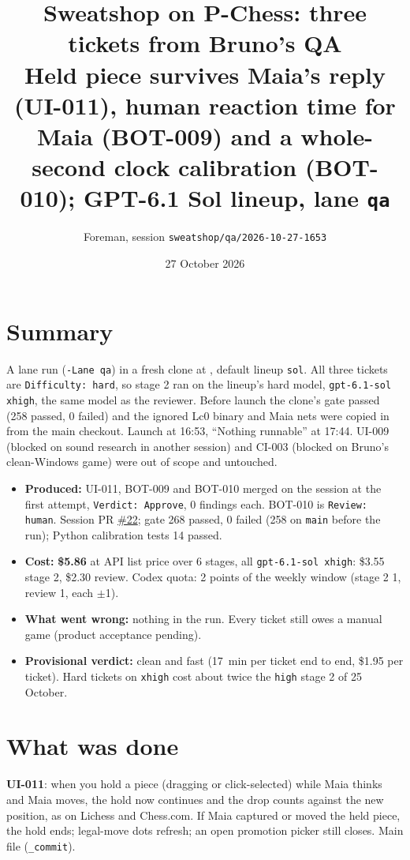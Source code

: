 \documentclass[11pt,a4paper]{article}
\title{Sweatshop on P-Chess: three tickets from Bruno's QA\\\large Held piece survives Maia's reply (UI-011), human reaction time for Maia (BOT-009) and a whole-second clock calibration (BOT-010); GPT-6.1 Sol lineup, lane \texttt{qa}}
\author{Foreman, session \texttt{sweatshop/qa/2026-10-27-1653}}
\date{27 October 2026}
\begin{document}
\maketitle

\section*{Summary}

A lane run (\texttt{-Lane qa}) in a fresh clone at , default
lineup \texttt{sol}. All three tickets are \texttt{Difficulty: hard}, so stage 2 ran on the
lineup's hard model, \texttt{gpt-6.1-sol xhigh}, the same model as the reviewer. Before launch
the clone's gate passed (258 passed, 0 failed) and the ignored Lc0 binary and Maia nets were
copied in from the main checkout. Launch at 16:53, ``Nothing runnable'' at 17:44.
UI-009 (blocked on sound research in another session) and CI-003 (blocked on Bruno's clean-Windows
game) were out of scope and untouched.

\begin{itemize}
  \item \textbf{Produced:} UI-011, BOT-009 and BOT-010 merged on the session at the first
        attempt, \texttt{Verdict: Approve}, 0 findings each. BOT-010 is \texttt{Review: human}.
        Session PR \href{https://github.com/Laginho/P-Chess/pull/22}{\#22}; gate 268 passed,
        0 failed (258 on \texttt{main} before the run); Python calibration tests 14 passed.
  \item \textbf{Cost:} \textbf{\$5.86} at API list price over 6 stages, all
        \texttt{gpt-6.1-sol xhigh}: \$3.55 stage 2, \$2.30 review. Codex quota: 2 points of the
        weekly window (stage 2 1, review 1, each $\pm$1).
  \item \textbf{What went wrong:} nothing in the run. Every ticket still owes a manual game
        (product acceptance pending).
  \item \textbf{Provisional verdict:} clean and fast (17~min per ticket end to end, \$1.95 per
        ticket). Hard tickets on \texttt{xhigh} cost about twice the \texttt{high} stage 2 of
        25 October.
\end{itemize}

\section*{What was done}

\textbf{UI-011}: when you hold a piece (dragging or click-selected) while Maia thinks and Maia
moves, the hold now continues and the drop counts against the new position, as on Lichess and
Chess.com. If Maia captured or moved the held piece, the hold ends; legal-move dots refresh; an
open promotion picker still closes. Main file  (\texttt{\_commit}).
\end{document}
